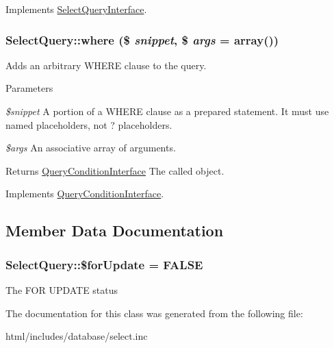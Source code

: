 Implements \hyperlink{interfaceSelectQueryInterface_a563903061a31b87f34189a56d6f8a591}{SelectQueryInterface}.\hypertarget{classSelectQuery_a9cd4e4c627c922318203fb1193784d18}{
\subsubsection[{where}]{\setlength{\rightskip}{0pt plus 5cm}SelectQuery::where (\$ {\em snippet}, \/  \$ {\em args} = {\ttfamily array()})}}
\label{classSelectQuery_a9cd4e4c627c922318203fb1193784d18}
Adds an arbitrary WHERE clause to the query.


\begin{DoxyParams}{Parameters}
\item[{\em \$snippet}]A portion of a WHERE clause as a prepared statement. It must use named placeholders, not ? placeholders. \item[{\em \$args}]An associative array of arguments.\end{DoxyParams}
\begin{DoxyReturn}{Returns}
\hyperlink{interfaceQueryConditionInterface}{QueryConditionInterface} The called object. 
\end{DoxyReturn}


Implements \hyperlink{interfaceQueryConditionInterface_a42c03c74dd81ef6d77041e67ec12e735}{QueryConditionInterface}.

\subsection{Member Data Documentation}
\hypertarget{classSelectQuery_a72a385abf2fbe4143df62f616af655af}{
\subsubsection[{\$forUpdate}]{\setlength{\rightskip}{0pt plus 5cm}SelectQuery::\$forUpdate = FALSE}}
\label{classSelectQuery_a72a385abf2fbe4143df62f616af655af}
The FOR UPDATE status 

The documentation for this class was generated from the following file:\begin{DoxyCompactItemize}
\item 
html/includes/database/select.inc\end{DoxyCompactItemize}
